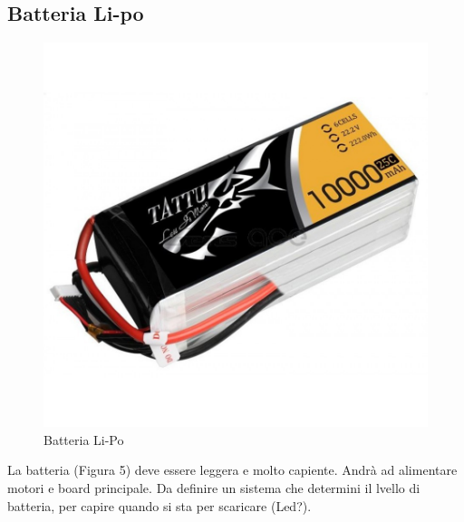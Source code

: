 \documentclass[]{article}
\begin{document}
\subsection{Batteria Li-po}
\begin{figure}[!htpb]
\centering
\includegraphics[scale=0.2]{figura5.jpg}
\caption{Batteria Li-Po}
\label{figura5}
\end{figure}
La batteria (Figura 5) deve essere leggera e molto capiente. Andrà ad alimentare motori e board principale. Da definire un sistema che determini il lvello di batteria, per capire quando si sta per scaricare (Led?).
\end{document}
